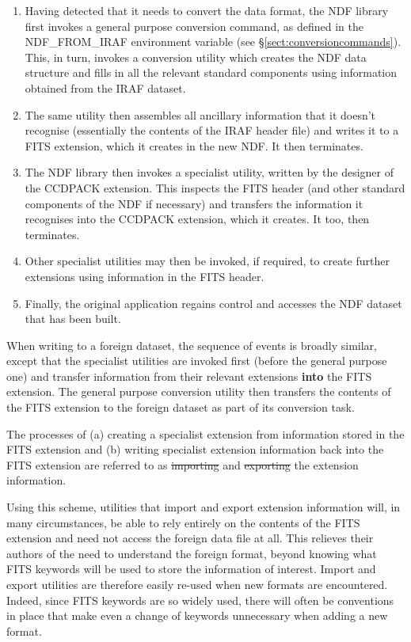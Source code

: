 \begin{enumerate}
\item Having detected that it needs to convert the data format, the
NDF library first invokes a general purpose conversion command, as
defined in the NDF\_FROM\_IRAF environment variable (see
\S\ref{sect:conversioncommands}). This, in turn, invokes a conversion
utility which creates the NDF data structure and fills in all the
relevant standard components using information obtained from the IRAF
dataset.

\item The same utility then assembles all ancillary information that
it doesn't recognise (essentially the contents of the IRAF header
file) and writes it to a FITS extension, which it creates in the new
NDF. It then terminates.

\item The NDF library then invokes a specialist utility, written by
the designer of the CCDPACK extension. This inspects the FITS header
(and other standard components of the NDF if necessary) and transfers
the information it recognises into the CCDPACK extension, which it
creates. It too, then terminates.

\item Other specialist utilities may then be invoked, if required, to
create further extensions using information in the FITS header.

\item Finally, the original application regains control and accesses
the NDF dataset that has been built.
\end{enumerate}

When writing to a foreign dataset, the sequence of events is broadly
similar, except that the specialist utilities are invoked first
(before the general purpose one) and transfer information from their
relevant extensions {\bf into} the FITS extension. The general purpose
conversion utility then transfers the contents of the FITS extension
to the foreign dataset as part of its conversion task.

The processes of (a) creating a specialist extension from information
stored in the FITS extension and (b) writing specialist extension
information back into the FITS extension are referred to as
\st{importing} and \st{exporting} the extension information. 

Using this scheme, utilities that import and export extension
information will, in many circumstances, be able to rely entirely on
the contents of the FITS extension and need not access the foreign
data file at all. This relieves their authors of the need to
understand the foreign format, beyond knowing what FITS keywords will
be used to store the information of interest.  Import and export
utilities are therefore easily re-used when new formats are
encountered.  Indeed, since FITS keywords are so widely used, there
will often be conventions in place that make even a change of keywords
unnecessary when adding a new format.

